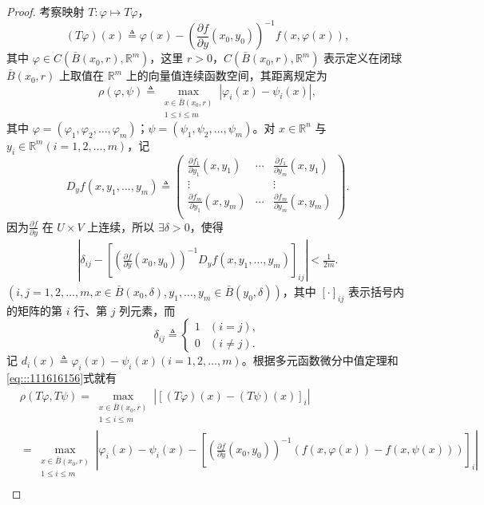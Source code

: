 \documentclass[../../main.tex]{subfiles}
\begin{document}
\begin{proof}
考察映射 \( T : \varphi \mapsto T\varphi \)，
\[
(T\varphi)(x) \triangleq \varphi(x) - \left( \frac{\partial f}{\partial y}(x_0, y_0) \right)^{-1} f(x, \varphi(x)),
\]
其中 \( \varphi \in C(\bar{B}(x_0, r), \mathbb{R}^m) \)，这里 \( r > 0 \)，\( C(\bar{B}(x_0, r), \mathbb{R}^m) \) 表示定义在闭球 \( \bar{B}(x_0, r) \) 上取值在 \( \mathbb{R}^m \) 上的向量值连续函数空间，其距离规定为
\[
\rho(\varphi, \psi) \triangleq \max_{\substack{x \in \bar{B}(x_0, r) \\ 1 \leq i \leq m}} |\varphi_i(x) - \psi_i(x)|,
\]
其中 \( \varphi = (\varphi_1, \varphi_2, \ldots, \varphi_m) \)；\( \psi = (\psi_1, \psi_2, \ldots, \psi_m) \)。对 \( x \in \mathbb{R}^n \) 与 \( y_i \in \mathbb{R}^m (i = 1, 2, \ldots, m) \)，记
\[
D_y f(x, y_1, \ldots, y_m) \triangleq \left( \begin{matrix}
\frac{\partial f_1}{\partial y_1}(x,y_1)&		\cdots&		\frac{\partial f_1}{\partial y_m}(x,y_1)\\
\vdots&		&		\vdots\\
\frac{\partial f_m}{\partial y_1}(x,y_m)&		\cdots&		\frac{\partial f_m}{\partial y_m}(x,y_m)\\
\end{matrix} \right) .
\]
因为\( \frac{\partial f}{\partial y} \) 在 \( U \times V \) 上连续，所以 \( \exists \delta > 0 \)，使得
\begin{align}
\left| \delta_{ij} - \left[ \left( \frac{\partial f}{\partial y}(x_0, y_0) \right)^{-1} D_y f(x, y_1, \ldots, y_m) \right]_{ij} \right| < \frac{1}{2m}.\label{eq:::111616156}
\end{align}
\( (i, j = 1, 2, \ldots, m, x \in \bar{B}(x_0, \delta), y_1, \ldots, y_m \in \bar{B}(y_0, \delta)) \)，其中 \( [\cdot]_{ij} \) 表示括号内的矩阵的第 \( i \) 行、第 \( j \) 列元素，而
\[
\delta_{ij} \triangleq \begin{cases} 
1 & (i = j), \\
0 & (i \neq j).
\end{cases}
\]
记 \( d_i(x) \triangleq \varphi_i(x) - \psi_i(x) (i = 1, 2, \ldots, m) \)。根据多元函数微分中值定理和\eqref{eq:::111616156}式就有
\begin{align}
&\rho(T\varphi, T\psi) = \max_{\substack{x \in \bar{B}(x_0, r) \\ 1 \leq i \leq m}} \left| \left[ (T\varphi)(x) - (T\psi)(x) \right]_i \right| \nonumber \\
&= \max_{\substack{x \in \bar{B}(x_0, r) \\ 1 \leq i \leq m}} \left| \varphi_i(x) - \psi_i(x) - \left[ \left( \frac{\partial f}{\partial y}(x_0, y_0) \right)^{-1} \left( f(x, \varphi(x)) - f(x, \psi(x)) \right) \right]_i \right| \nonumber \\

\end{align}
\end{proof}
\end{document}
